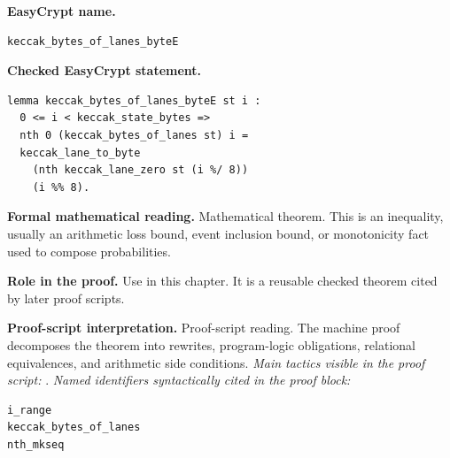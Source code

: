 \begin{formaltheorem}
\noindent\textbf{EasyCrypt name.}
\begin{lstlisting}[language=EasyCrypt,basicstyle=\ttfamily\scriptsize]
keccak_bytes_of_lanes_byteE
\end{lstlisting}
\noindent\textbf{Checked EasyCrypt statement.}
\begin{lstlisting}[language=EasyCrypt,basicstyle=\ttfamily\scriptsize]
lemma keccak_bytes_of_lanes_byteE st i :
  0 <= i < keccak_state_bytes =>
  nth 0 (keccak_bytes_of_lanes st) i =
  keccak_lane_to_byte
    (nth keccak_lane_zero st (i %/ 8))
    (i %% 8).
\end{lstlisting}
\noindent\textbf{Formal mathematical reading.}
Mathematical theorem. This is an inequality, usually an arithmetic loss bound, event inclusion bound, or monotonicity fact used to compose probabilities.

\noindent\textbf{Role in the proof.}
Use in this chapter. It is a reusable checked theorem cited by later proof scripts.

\noindent\textbf{Proof-script interpretation.}
Proof-script reading. The machine proof decomposes the theorem into rewrites, program-logic obligations, relational equivalences, and arithmetic side conditions.
\emph{Main tactics visible in the proof script:} .
\emph{Named identifiers syntactically cited in the proof block:}
\begin{lstlisting}[language=EasyCrypt,basicstyle=\ttfamily\scriptsize]
i_range
keccak_bytes_of_lanes
nth_mkseq
\end{lstlisting}

\end{formaltheorem}

